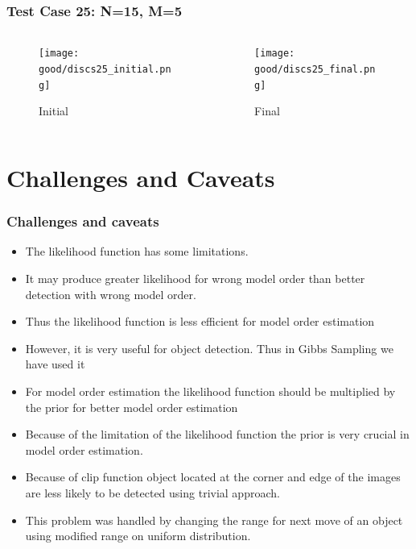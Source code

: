 \documentclass[11pt]{beamer}
\begin{document}
\begin{frame}
\frametitle{Test Case 25: N=15, M=5}
\begin{columns}
\begin{column}{.45\textwidth}
\begin{figure}
  \texttt{[image: good/discs25\_initial.png]}
  \caption{Initial}
\end{figure}
\end{column}
\begin{column}{.45\textwidth}
\begin{figure}
  \texttt{[image: good/discs25\_final.png]}
  \caption{Final}
\end{figure}
\end{column}
\end{columns}
\end{frame}



\section{Challenges and Caveats}
\begin{frame}
\frametitle{Challenges and caveats}
	\begin{itemize}
		\item The likelihood function has some limitations. 
		\item It may produce greater likelihood for wrong model order than better detection with wrong model order.
    	\item Thus the likelihood function is less efficient for model order estimation
		\item However, it is very useful for object detection. Thus in Gibbs Sampling we have used it
		\item For model order estimation the likelihood function should be multiplied by the prior for better model order estimation
		\item Because of the limitation of the likelihood function the prior is very crucial in model order estimation.
		\item Because of clip function object located at the corner and edge of the images are less likely to be detected using trivial approach.
		\item This problem was handled by changing the range for next move of an object using modified range on uniform distribution.
	\end{itemize}
\end{frame}
\end{document}
